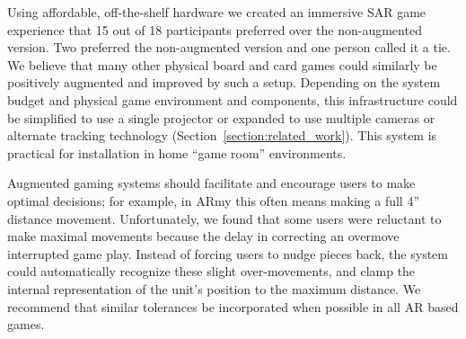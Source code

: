 \documentclass[10pt,twocolumn,letterpaper]{article}
\begin{document}
Using affordable, off-the-shelf hardware we created an immersive SAR
game experience that 15 out of 18 participants preferred over the
non-augmented version.  Two preferred the non-augmented version and
one person called it a tie.
We believe that many other physical board and card games could
similarly be positively augmented and improved by such a setup.  
%
Depending on the system budget and physical game environment and
components, this infrastructure could be simplified to use a single
projector or expanded to use multiple cameras or alternate tracking
technology (Section~\ref{section:related_work}).  This system is
practical for installation in home ``game room'' environments.


Augmented gaming systems should facilitate and encourage users to make
optimal decisions; for example, in ARmy this often means making a full
4'' distance movement.
Unfortunately, we found that some users were reluctant to make maximal
movements because the delay in correcting an overmove interrupted game
play.
Instead of forcing users to nudge pieces back, the system could
automatically recognize these slight over-movements, and clamp the
internal representation of the unit's position to the maximum
distance.
We recommend that similar tolerances be incorporated when possible in
all AR based games.
\end{document}
